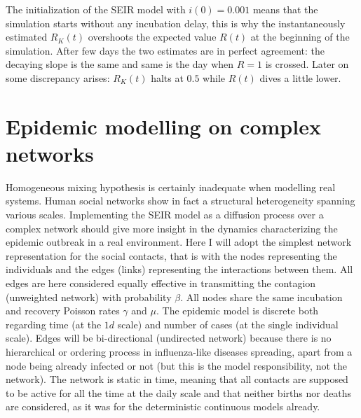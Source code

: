 \documentclass[DIV=12, BCOR=0pt]{scrartcl}  %
\begin{document}
	The initialization of the SEIR model with $i(0) = 0.001$ means that the simulation starts without any incubation delay, this is why the instantaneously estimated $R_K(t)$ overshoots the expected value $R(t)$ at the beginning of the simulation. After few days the two estimates are in perfect agreement: the decaying slope is the same and same is the day when $R = 1$ is crossed. Later on some discrepancy arises: $R_K(t)$ halts at $0.5$ while $R(t)$ dives a little lower.
 
  

  
  \section{Epidemic modelling on complex networks}
  \label{sec:network}
  Homogeneous mixing hypothesis is certainly inadequate when modelling real systems. Human social networks show in fact a structural heterogeneity spanning various scales. Implementing the SEIR model as a diffusion process over a complex network should give more insight in the dynamics characterizing the epidemic outbreak in a real environment. Here I will adopt the simplest network representation for the social contacts, that is with the nodes representing the individuals and the edges (links) representing the interactions between them. All edges are here considered equally effective in transmitting the contagion (unweighted network) with probability $\beta$. All nodes share the same incubation and recovery Poisson rates $\gamma$ and $\mu$. 
  The epidemic model is discrete both regarding time (at the $1 d$ scale) and number of cases (at the single individual scale). Edges will be bi-directional (undirected network) because there is no hierarchical or ordering process in influenza-like diseases spreading, apart from a node being already infected or not (but this is the model responsibility, not the network). The network is static in time, meaning that all contacts are supposed to be active for all the time at the daily scale and that neither births nor deaths are considered, as it was for the deterministic continuous models already. 
  
\end{document}

